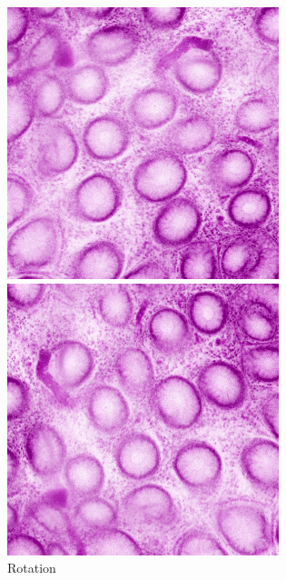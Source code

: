\begin{figure}[H]
\begin{minipage}{0.24\columnwidth}
		\subcaption{90\deg}
	\end{minipage}
	\begin{minipage}{0.24\columnwidth}
		\centering
		\includegraphics[clip, width=\linewidth]{fig/preprocessing/data_aug/rotate/ROTATION_180}
		\subcaption{180\deg}
	\end{minipage}
	\begin{minipage}{0.24\columnwidth}
		\centering
		\includegraphics[clip, width=\linewidth]{fig/preprocessing/data_aug/rotate/ROTATION_270}
		\subcaption{270\deg}
	\end{minipage}
	
	\caption{Rotation}
	\label{fig:回転}
	
\end{figure}


